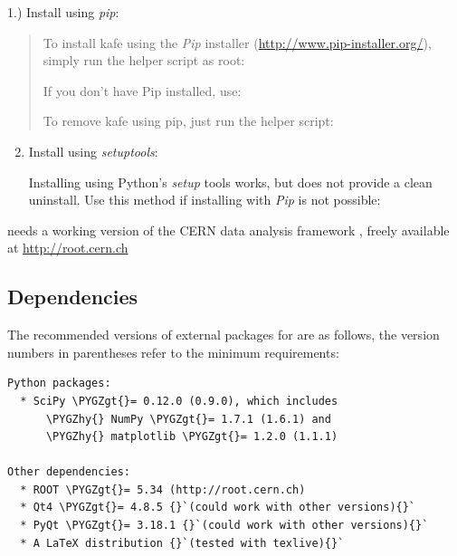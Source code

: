 \documentclass[a4paper,10pt,english]{sphinxmanual}
\def\PYGZgt{\char`\>}
\def\PYGZhy{\char`\-}
\begin{document}
1.) Install using \emph{pip}:
\begin{quote}

To install kafe using the \emph{Pip} installer
(\href{http://www.pip-installer.org/}{http://www.pip-installer.org/}), simply
run the helper script as root:
\begin{quote}

\end{quote}

If you don't have Pip installed, use:
\begin{quote}

\end{quote}

To remove kafe using pip, just run the helper script:
\begin{quote}

\end{quote}
\end{quote}
\begin{enumerate}
\setcounter{enumi}{1}
\item {} 
Install using \emph{setuptools}:

Installing using Python's \emph{setup} tools works, but does not
provide a clean uninstall. Use this method if installing
with \emph{Pip} is not possible:
\begin{quote}

\end{quote}

\end{enumerate}

 needs a working version of the CERN data analysis framework ,
freely available at  \href{http://root.cern.ch}{http://root.cern.ch}


\subsection{Dependencies}
\label{index:dependencies}
The recommended versions of external packages for  are as follows,
the version numbers in parentheses refer to the minimum requirements:

\begin{Verbatim}[commandchars=\\\{\}]
Python packages:
  * SciPy \PYGZgt{}= 0.12.0 (0.9.0), which includes
      \PYGZhy{} NumPy \PYGZgt{}= 1.7.1 (1.6.1) and
      \PYGZhy{} matplotlib \PYGZgt{}= 1.2.0 (1.1.1)

Other dependencies:
  * ROOT \PYGZgt{}= 5.34 (http://root.cern.ch)
  * Qt4 \PYGZgt{}= 4.8.5 {}`(could work with other versions){}`
  * PyQt \PYGZgt{}= 3.18.1 {}`(could work with other versions){}`
  * A LaTeX distribution {}`(tested with texlive){}`
\end{Verbatim}
\end{document}
